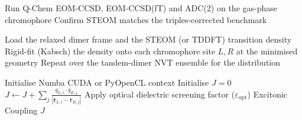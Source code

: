 \documentclass[journal=jpcbfk, manuscript=article, layout=twocolumn, doi=true]{achemso}
\begin{document}
\begin{algorithm*}[ht]
\begin{algorithmic}[1]
\vspace{0.2cm}
 
    \State Run Q-Chem EOM-CCSD, EOM-CCSD(fT) and ADC(2) on the gas-phase chromophore
    \State Confirm STEOM matches the triples-corrected benchmark
\EndProcedure

\vspace{0.2cm}
    \State Load the relaxed dimer frame and the STEOM (or TDDFT) transition density
    \State Rigid-fit (Kabsch) the density onto each chromophore site $L,R$
    \State {} at the minimised geometry
    \State Repeat over the tandem-dimer NVT ensemble for the distribution
\EndProcedure

\vspace{0.2cm}
    \State Initialise Numba CUDA or PyOpenCL context
    \State Initialise $J = 0$
        \State $J \gets J + \sum_j \frac{q_{L,i} \cdot q_{R,j}}{|\mathbf{r}_{L,i} - \mathbf{r}_{R,j}|}$
    \EndFor
    \State Apply optical dielectric screening factor ($\varepsilon_{\mathrm{opt}}$)
    \State \Return Excitonic Coupling $J$
\EndProcedure
\end{algorithmic}
\end{algorithm*}
\end{document}
